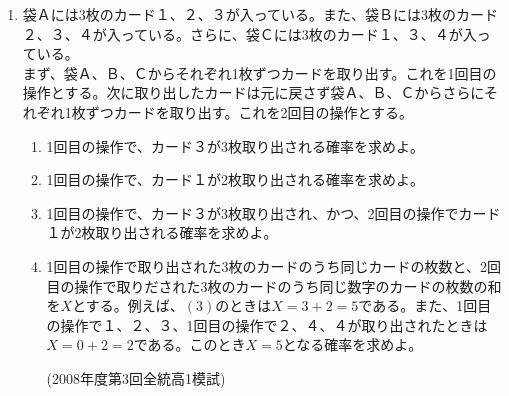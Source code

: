 \documentclass[10pt,a4paper,fleqn]{jsarticle}
\begin{document}
\begin{enumerate}
\item 袋Ａには3枚のカード１、２、３が入っている。また、袋Ｂには3枚のカード２、３、４が入っている。さらに、袋Ｃには3枚のカード１、３、４が入っている。\\
まず、袋Ａ、Ｂ、Ｃからそれぞれ1枚ずつカードを取り出す。これを1回目の操作とする。次に取り出したカードは元に戻さず袋Ａ、Ｂ、Ｃからさらにそれぞれ1枚ずつカードを取り出す。これを2回目の操作とする。
\begin{enumerate}[(1)]
\item 1回目の操作で、カード３が3枚取り出される確率を求めよ。
\item 1回目の操作で、カード１が2枚取り出される確率を求めよ。
\item 1回目の操作で、カード３が3枚取り出され、かつ、2回目の操作でカード１が2枚取り出される確率を求めよ。
\item 1回目の操作で取り出された3枚のカードのうち同じカードの枚数と、2回目の操作で取りだされた3枚のカードのうち同じ数字のカードの枚数の和を$X$とする。例えば、$(3)$のときは$X=3+2=5$である。また、1回目の操作で１、２、３、1回目の操作で２、４、４が取り出されたときは$X=0+2=2$である。このとき$X=5$となる確率を求めよ。
\begin{flushright}
(2008年度第3回全統高1模試)
\end{flushright}
\end{enumerate}

\end{enumerate}
\end{document}
